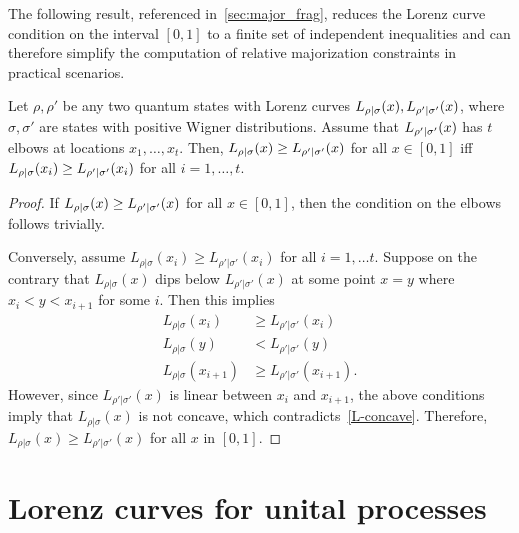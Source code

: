 \documentclass[pra,
aps,
twocolumn,
superscriptaddress,
groupedaddress,
nofootinbib,
reprint
]{revtex4-1}
\begin{document}
The following result, referenced in~\cref{sec:major_frag}, reduces the Lorenz curve condition on the interval $[0,1]$ to a finite set of independent inequalities and can therefore simplify the computation of relative majorization constraints in practical scenarios.
\begin{proposition}\label{thm:elbows}
	Let $\rho, \rho'$ be any two quantum states with Lorenz curves ${L_{\rho|\sigma}}(x), {L_{\rho'|\sigma'}}(x)$, where $\sigma, \sigma'$ are states with positive Wigner distributions. Assume that ${L_{\rho'|\sigma'}}(x)$ has $t$ elbows at locations $x_1, \dots, x_t$. Then, ${L_{\rho|\sigma}}(x) \geq {L_{\rho'|\sigma'}}(x)$ for all $x \in [0,1]$ iff ${L_{\rho|\sigma}}(x_{i}) \geq {L_{\rho'|\sigma'}}(x_{i})$ for all $i =1,\dots,t$.
\end{proposition}
\begin{proof}	
If ${L_{\rho|\sigma}}(x) \geq {L_{\rho'|\sigma'}}(x)$ for all $x \in [0,1]$, then the condition on the elbows follows trivially.

Conversely, assume $L_{\rho|\sigma}(x_i) \geq L_{\rho'|\sigma'}(x_i)$ for all $i=1,\dots t$. 
Suppose on the contrary that $L_{\rho|\sigma}(x)$ dips below $L_{\rho'|\sigma'}(x)$ at some point $x=y$ where $x_i < y < x_{i+1}$ for some $i$. Then this implies
\begin{align}
L_{\rho|\sigma}(x_i) &\ge L_{\rho'|\sigma'}(x_i) \nonumber \\
L_{\rho|\sigma}(y) & <L_{\rho'|\sigma'}(y) \nonumber \\
L_{\rho|\sigma}(x_{i+1}) &\ge L_{\rho'|\sigma'}(x_{i+1}).
\end{align}
However, since $L_{\rho'|\sigma'}(x)$ is linear between $x_i$ and $x_{i+1}$, the above conditions imply that $L_{\rho|\sigma}(x)$ is not concave, which contradicts~\cref{L-concave}. 
Therefore, $L_{\rho|\sigma}(x) \geq L_{\rho'|\sigma'}(x)$ for all $x$ in $[0,1]$.
\end{proof}

\section{Lorenz curves for unital processes}
\label{app:lcsu_technical}
\end{document}
